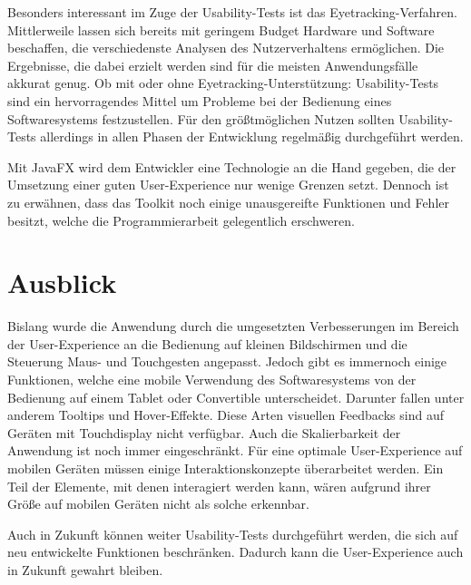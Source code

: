Besonders interessant im Zuge der Usability-Tests ist das Eyetracking-Verfahren. Mittlerweile lassen sich bereits mit geringem Budget Hardware und Software beschaffen, die verschiedenste Analysen des Nutzerverhaltens ermöglichen. Die Ergebnisse, die dabei erzielt werden sind für die meisten Anwendungsfälle akkurat genug. Ob mit oder ohne Eyetracking-Unterstützung: Usability-Tests sind ein hervorragendes Mittel um Probleme bei der Bedienung eines Softwaresystems festzustellen. Für den größtmöglichen Nutzen sollten Usability-Tests allerdings in allen Phasen der Entwicklung regelmäßig durchgeführt werden.\par
Mit JavaFX wird dem Entwickler eine Technologie an die Hand gegeben, die der Umsetzung einer guten User-Experience nur wenige Grenzen setzt. Dennoch ist zu erwähnen, dass das Toolkit noch einige unausgereifte Funktionen und Fehler besitzt, welche die Programmierarbeit gelegentlich erschweren.\par
\section{Ausblick}
Bislang wurde die Anwendung durch die umgesetzten Verbesserungen im Bereich der User-Experience an die Bedienung auf kleinen Bildschirmen und die Steuerung Maus- und Touchgesten angepasst. Jedoch gibt es immernoch einige Funktionen, welche eine mobile Verwendung des Softwaresystems von der Bedienung auf einem Tablet oder Convertible unterscheidet. Darunter fallen unter anderem Tooltips und Hover-Effekte. Diese Arten visuellen Feedbacks sind auf Geräten mit Touchdisplay nicht verfügbar. Auch die Skalierbarkeit der Anwendung ist noch immer eingeschränkt. Für eine optimale User-Experience auf mobilen Geräten müssen einige Interaktionskonzepte überarbeitet werden. Ein Teil der Elemente, mit denen interagiert werden kann, wären aufgrund ihrer Größe auf mobilen Geräten nicht als solche erkennbar.\par
Auch in Zukunft können weiter Usability-Tests durchgeführt werden, die sich auf neu entwickelte Funktionen beschränken. Dadurch kann die User-Experience auch in Zukunft gewahrt bleiben.\par